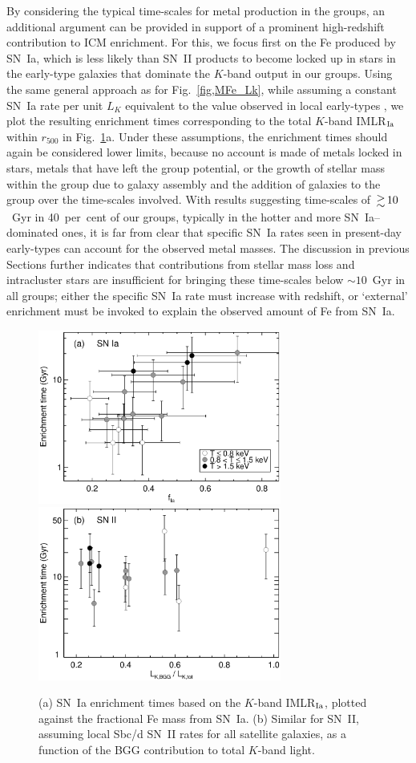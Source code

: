 \documentclass[useAMS,usenatbib]{mn2e}
\begin{document}
By considering the typical time-scales for metal production in the
groups, an additional argument can be provided in support of a
prominent high-redshift contribution to ICM enrichment. For this, we
focus first on the Fe produced by SN~Ia, which is less likely than
SN~II products to become locked up in stars in the early-type galaxies
that dominate the $K$-band output in our groups.  Using the same
general approach as for Fig.~\ref{fig,MFe_Lk}, while assuming a
constant SN~Ia rate per unit $L_K$ equivalent to the value observed in
local early-types \citep{mann05}, we plot the resulting enrichment
times corresponding to the total $K$-band IMLR$_{\rm Ia}$ within
$r_{500}$ in Fig.~\ref{fig,tot_times}a.  Under these assumptions, the
enrichment times should again be considered lower limits, because no
account is made of metals locked in stars, metals that have left the
group potential, or the growth of stellar mass within the group due to
galaxy assembly and the addition of galaxies to the group over the
time-scales involved. With results suggesting time-scales of $\ga
10$~Gyr in 40~per~cent of our groups, typically in the hotter and more
SN~Ia--dominated ones, it is far from clear that specific SN~Ia rates
seen in present-day early-types can account for the observed metal
masses. The discussion in previous Sections further indicates that
contributions from stellar mass loss and intracluster stars are
insufficient for bringing these time-scales below $\sim 10$~Gyr in all
groups; either the specific SN~Ia rate must increase with redshift, or
`external' enrichment must be invoked to explain the observed amount
of Fe from SN~Ia.


\begin{figure} 
 \includegraphics[width=80mm]{fig19a.eps}
 \includegraphics[width=80mm]{fig19b.eps}
 \caption{(a) SN~Ia enrichment times based on the $K$-band IMLR$_{\rm
    Ia}$, plotted against the fractional Fe mass from SN~Ia. (b)
    Similar for SN~II, assuming local Sbc/d SN~II rates for all
    satellite galaxies, as a function of the BGG contribution to total
    $K$-band light.}
\label{fig,tot_times} 
\end{figure}  
\end{document}
